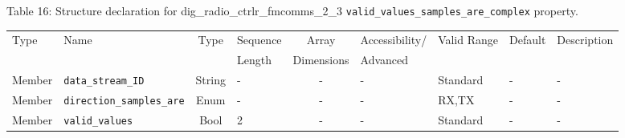 \documentclass{article}
\def\comp{dig\_radio\_ctrlr\_fmcomms\_2\_3}
\begin{document}
\begin{landscape}
	\noindent Table \hypertarget{tab16}{16}: Structure declaration for \comp{} \verb+valid_values_samples_are_complex+ property.
	\begin{scriptsize}
		\noindent\begin{longtable}{|p{1.8cm}|p{3.6cm}|c|p{2cm}|c|p{2cm}|p{1.7cm}|p{0.8cm}|p{6.81cm}|}
			\hline
			\rowcolor{blue}
			Type         & Name                                & Type & Sequence & Array      & Accessibility/ & Valid Range  & Default & Description                                                                                                                                                                                                                       \\
			\rowcolor{blue}
			             &                                     &      & Length   & Dimensions & Advanced       &              &         &                                                                                                                                                                                                                             \\
			\hline
			Member       & \verb+data_stream_ID+               & String& -       & -          & -              & Standard     & -       & - \\
			\hline
			Member       & \verb+direction_samples_are+        & Enum  & -       & -          & -              & RX,TX        & -       & - \\
			\hline
			Member       & \verb+valid_values+                 & Bool  & 2       & -          & -              & Standard & -       & - \\
			\hline
		\end{longtable}
	\end{scriptsize}


\end{landscape}
\end{document}
